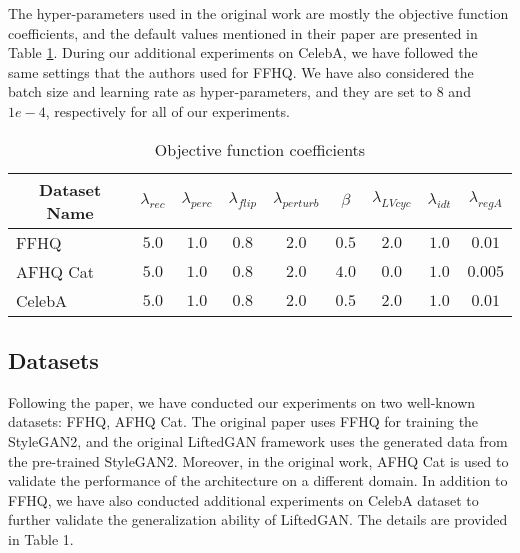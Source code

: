 The hyper-parameters used in the original work are mostly the objective function coefficients, and the default values mentioned in their paper are presented in Table \ref{tab:hyperparams}. During our additional experiments on CelebA, we have followed the same settings that the authors used for FFHQ. 
We have also considered the batch size and learning rate as hyper-parameters, and they are set to $8$ and $1e-4$, respectively for all of our experiments.

\begin{table}[t!]
\centering
\caption{Objective function coefficients}
\begin{tabular}{|l|c|c|c|c|c|c|c|c|}
\hline
\multicolumn{1}{|c|}{\textbf{Dataset Name}} & $\lambda_{rec}$ & $\lambda_{perc}$ & $\lambda_{flip}$ & $\lambda_{perturb}$ & $\beta$ & $\lambda_{LVcyc}$ & $\lambda_{idt}$ & $\lambda_{regA}$ \\ \hline
FFHQ                                        & $5.0$       & $1.0$      & $0.8$ &  $2.0$ & $0.5$ &  $2.0$ & $1.0$  & $0.01$      \\ \hline
AFHQ Cat                                    & $5.0$       & $1.0$      & $0.8$ &  $2.0$ & $4.0$ &  $0.0$ & $1.0$  & $0.005$  \\ \hline
CelebA                                      & $5.0$       & $1.0$      & $0.8$ &  $2.0$ & $0.5$ &  $2.0$ & $1.0$  & $0.01$            \\ \hline
\end{tabular}
\label{tab:hyperparams}
\end{table}

\subsection{Datasets}
Following the paper, we have conducted our experiments on two well-known datasets: FFHQ, AFHQ Cat. The original paper uses FFHQ for training the StyleGAN2, and the original LiftedGAN framework uses the generated data from the pre-trained StyleGAN2. Moreover, in the original work, AFHQ Cat is used to validate the performance of the architecture on a different domain. In addition to FFHQ, we have also conducted additional experiments on CelebA dataset to further validate the generalization ability of LiftedGAN. The details are provided in Table 1.

